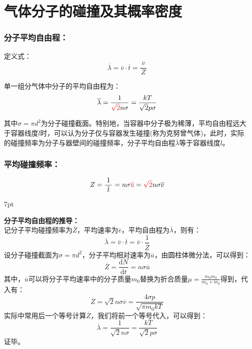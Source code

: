 \documentclass[zihao=-4,UTF8]{report}
\newenvironment{graybox}{%
\def\FrameCommand{%
\hspace{1pt}%
{\color{gray}\small \vrule width 2pt}%
{\color{graybox_color}\vrule width 4pt}%
\colorbox{graybox_color}%
}%
\MakeFramed{\advance\hsize-\width\FrameRestore}%
\noindent\hspace{-4.55pt}%
\begin{adjustwidth}{}{7pt}%
\vspace{2pt}\vspace{2pt}%
}
{%
\vspace{2pt}\end{adjustwidth}\endMakeFramed%
}
\begin{document}
\section{气体分子的碰撞及其概率密度}

\subsubsection{分子平均自由程：}
定义式：
\begin{equation}
    \overline{\lambda} = \overline{v}\cdot \overline{t} = \frac{\ \overline{v}\ }{Z}
\end{equation}\par
单一组分气体中分子的平均自由程为：
\begin{equation}
    \overline{\lambda} = \frac{1}{\textcolor{red}{\sqrt{2}}n \sigma } = \frac{kT}{\sqrt{2}p\sigma}
\end{equation}\par
{\color{gray}\small 其中$\sigma = \pi d^2$为分子碰撞截面。特别地，当容器中分子极为稀薄，平均自由程远大于容器线度$l$时，可以认为分子仅与容器发生碰撞(称为克努曾气体)，此时，实际的碰撞频率为分子与器壁间的碰撞频率，分子平均自由程$\overline{\lambda}$等于容器线度$l$。}
\subsubsection{平均碰撞频率：}
\begin{equation}
    Z = \frac{1}{\ \overline{t}\ } =  n\sigma \textcolor{red}{\overline{u}} = \textcolor{red}{\sqrt{2}}n\sigma \overline{v}
\end{equation}
\par

\begin{graybox}
    \textbf{分子平均自由程的推导：}\\
    记分子平均碰撞频率为$\overline{Z}$，平均速率为$\overline{v}$，平均自由程为$\overline{\lambda}$，则有：
\begin{equation}
    \overline{\lambda} =\overline{v}\cdot \overline{t} =\overline{v}\cdot \frac{1}{\overline{Z}}
\end{equation}
设分子碰撞截面为$\sigma = \pi d^2$，分子平均相对速率为$\overline{u}$，由圆柱体微分法，可以得到：
\begin{equation}
    \overline{Z} = \frac{\mathrm{d}N}{\mathrm{d}t} = n\sigma \overline{u}
\end{equation}
其中，$\overline{u}$可以将分子平均速率中的分子质量$m_0$替换为折合质量$\mu = \frac{m_0m_0}{m_0+m_0}$得到，代入有：
\begin{equation}
    \overline{Z} = \sqrt{2}n\sigma\overline{v}  = \frac{4\sigma p}{\sqrt{\pi m_0kT}}
\end{equation}
实际中常用后一个等号计算$\overline{Z}$，我们将前一个等号代入，可以得到：
\begin{equation}
    \overline{\lambda} = \frac{1}{\sqrt{2}n\sigma}= \frac{kT}{\sqrt{2}p\sigma}
\end{equation}
证毕。
\end{graybox}
\end{document}
